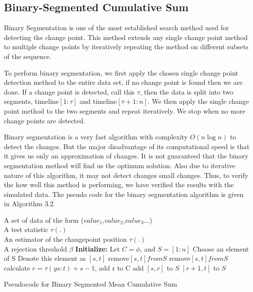 \subsection{\label{Binary-Segmented Cumulative Sum}Binary-Segmented Cumulative Sum}
Binary Segmentation is one of the most established search method used for detecting the change point. This method extends any single change point method to multiple change points by iteratively repeating the method on different subsets of the sequence.\par 
To perform binary segmentation, we first apply the chosen single change point detection method to the entire data set, if no change point is found then we are done. If a change point is detected, call this $\tau$, then the data is split into two segments, timeline$[1:\tau]$ and timeline$[\tau+1:n]$. We then apply the single change point method to the two segments and repeat iteratively. We stop when no more change points are detected.\par
Binary segmentation is a very fast algorithm with complexity $O(n\log n)$ to detect the changes. But the major disadvantage of its computational speed is that it gives us only an approximation of changes. It is not guaranteed that the binary segmentation method will find us the optimum solution. Also due to iterative nature of this algorithm, it may not detect changes small changes. Thus, to verify the how well this method is performing, we have verified the results with the simulated data. 
The pseudo code for the binary segmentation algorithm is given in Algorithm $3.2$. 

\begin{algorithm}[!h]
	\begin{algorithmic}[1]
		 \State \algorithmicrequire A set of data of the form ($value_1$,$value_2$,$value_3$...)\\
		\qquad\quad\enspace A test statistic $\tau(.)$\\
		\qquad\quad\enspace An estimator of the changepoint position $\tau(.)$\\
		\qquad\quad\enspace A rejection threshold $\beta$
		\State\textbf{Initialize:} Let $C=\phi$, and $S=[1:n]$
			\State Choose an element of S
			\State Denote this element as $[s,t]$
				\State remove$[s,t] from S$
			\EndIf
				\State remove$[s,t] from S$
				\State calculate $ r=\tau(ys:t)+s-1 $, 
				\State add r to C
					\State add $[s,r]$ to $S$
				\EndIf
					\State $[r+1,t]$ to $S$
				\EndIf
			\EndIf
		\EndWhile	
		\caption{Pseudocode for Binary Segmented Mean Cumulative Sum}
		\label{Pseudocode for Binary Segmented Mean Cumulative Sum}
	\end{algorithmic}
\end{algorithm}
\clearpage
